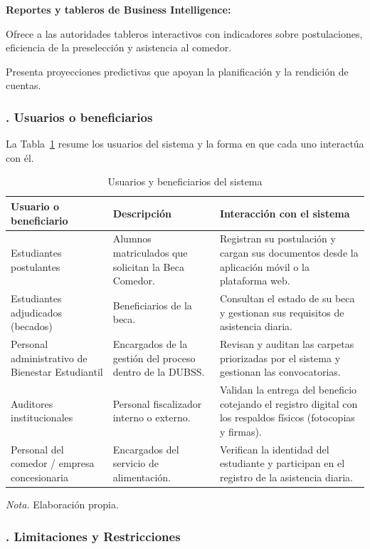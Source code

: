 \noindent\textbf{Reportes y tableros de Business Intelligence:}
\begin{incisos}
    \item Ofrece a las autoridades tableros interactivos con indicadores sobre postulaciones, eficiencia de la preselección y asistencia al comedor.
    \item Presenta proyecciones predictivas que apoyan la planificación y la rendición de cuentas.
\end{incisos}

\subsubsection{. Usuarios o beneficiarios}\label{sec:usuarios_beneficiarios}

La Tabla~\ref{tab:usuarios_beneficiarios} resume los usuarios del sistema y la forma en que cada uno interactúa con él.

\begin{table}[H]
\caption{Usuarios y beneficiarios del sistema}
\label{tab:usuarios_beneficiarios}
\begin{threeparttable}
\begin{tabular}{>{\raggedright\arraybackslash}p{3.6cm} >{\raggedright\arraybackslash}p{5.2cm} >{\raggedright\arraybackslash}p{4.4cm}}
\toprule
Usuario o beneficiario & Descripción & Interacción con el sistema \\
\midrule
Estudiantes postulantes & Alumnos matriculados que solicitan la Beca Comedor. & Registran su postulación y cargan sus documentos desde la aplicación móvil o la plataforma web. \\
Estudiantes adjudicados (becados) & Beneficiarios de la beca. & Consultan el estado de su beca y gestionan sus requisitos de asistencia diaria. \\
Personal administrativo de Bienestar Estudiantil & Encargados de la gestión del proceso dentro de la DUBSS. & Revisan y auditan las carpetas priorizadas por el sistema y gestionan las convocatorias. \\
Auditores institucionales & Personal fiscalizador interno o externo. & Validan la entrega del beneficio cotejando el registro digital con los respaldos físicos (fotocopias y firmas). \\
Personal del comedor / empresa concesionaria & Encargados del servicio de alimentación. & Verifican la identidad del estudiante y participan en el registro de la asistencia diaria. \\
\bottomrule
\end{tabular}
\begin{tablenotes}
\item \textit{Nota.} Elaboración propia.
\end{tablenotes}
\end{threeparttable}
\end{table}

\subsubsection{. Limitaciones y Restricciones}\label{sec:limitaciones_restricciones}


